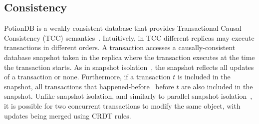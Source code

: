 \documentclass[sigconf, nonacm]{acmart}
\begin{document}



\subsection{Consistency}
\label{sec:consistency}

PotionDB is a weakly consistent database that provides Transactional Causal Consistency (TCC) 
semantics~\cite{cure,Wu20Transactional,walter}.
Intuitively, in TCC different replicas may execute transactions in different orders.
A transaction accesses a causally-consistent database snapshot taken in the replica where the transaction executes
at the time the transaction starts. 
As in snapshot isolation~\cite{Berenson95Critique},  the snapshot reflects all updates of a transaction or none.   
Furthermore, if a transaction $t$ is included in the snapshot, all transactions that 
happened-before~\cite{lamport78} before $t$ are also included in the snapshot.
Unlike snapshot isolation, and similarly to parallel snapshot isolation~\cite{walter}, it is
possible for two concurrent transactions to modify the same object, with updates
being merged using CRDT rules.
\end{document}
